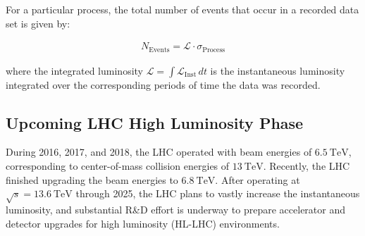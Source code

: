 For a particular process, the total number of events that occur in a recorded data set is given by:
\begin{linenomath*}
\begin{align}
N_{\text {Events}}= \mathcal{L} \cdot \sigma_{\text{Process}}
\end{align}
\end{linenomath*}
where the integrated luminosity $\mathcal{L} = \int \mathcal{L}_{\text{Inst}} \,dt$ is the instantaneous luminosity integrated over the corresponding periods of time the data was recorded.

\subsection{Upcoming LHC High Luminosity Phase}
During 2016, 2017, and 2018, the LHC operated with beam energies of $\SI{6.5}{\TeV}$, corresponding to center-of-mass collision energies of $\SI{13}{\TeV}$.
Recently, the LHC finished upgrading the beam energies to $\SI{6.8}{\TeV}$.
After operating at $\sqrt{s}=\SI{13.6}{\TeV}$ through 2025, the LHC plans to vastly increase the instantaneous luminosity, and substantial R\&D effort is underway to prepare accelerator and detector upgrades for high luminosity (HL-LHC) environments.

